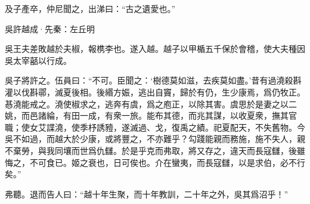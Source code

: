 \documentclass[12pt,a4paper]{ctexbook}
\begin{document}
及子產卒，仲尼聞之，出涕曰：“古之遺愛也。”\par
吳許越成·先秦：左丘明 \par
吳王夫差敗越於夫椒，報槜李也。遂入越。越子以甲楯五千保於會稽，使大夫種因吳太宰嚭以行成。\par
吳子將許之。伍員曰：“不可。臣聞之：‘樹德莫如滋，去疾莫如盡。’昔有過澆殺斟灌以伐斟鄩，滅夏後相。後緡方娠，逃出自竇，歸於有仍，生少康焉，爲仍牧正。惎澆能戒之。澆使椒求之，逃奔有虞，爲之庖正，以除其害。虞思於是妻之以二姚，而邑諸綸，有田一成，有衆一旅。能布其德，而兆其謀，以收夏衆，撫其官職；使女艾諜澆，使季杼誘豷，遂滅過、戈，復禹之績。祀夏配天，不失舊物。今吳不如過，而越大於少康，或將豐之，不亦難乎？勾踐能親而務施，施不失人，親不棄勞，與我同壤而世爲仇讎。於是乎克而弗取，將又存之，違天而長寇讎，後雖悔之，不可食已。姬之衰也，日可俟也。介在蠻夷，而長寇讎，以是求伯，必不行矣。”\par
弗聽。退而告人曰：“越十年生聚，而十年教訓，二十年之外，吳其爲沼乎！”\par
\end{document}
